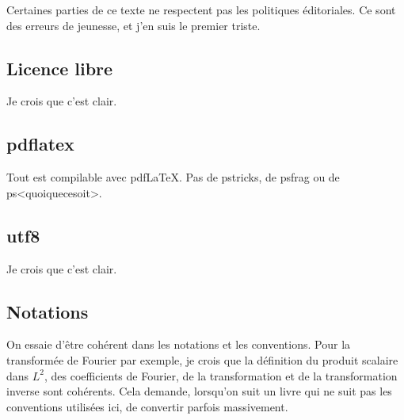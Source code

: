 Certaines parties de ce texte ne respectent pas les politiques éditoriales. Ce sont des erreurs de jeunesse, et j'en suis le premier triste.

\subsection{Licence libre}
\label{SUBooINTROpoliticsFreelic}

Je crois que c'est clair.

\subsection{pdflatex}
\label{SUBooINTROpoliticsPdflatex}

Tout est compilable avec pdf\LaTeX. Pas de pstricks, de psfrag ou de ps<quoiquecesoit>.

\subsection{utf8}
\label{SUBooINTROpoliticsUTF8}

Je crois que c'est clair.

\subsection{Notations}
\label{SUBooINTROpoliticsNotations}

On essaie d'être cohérent dans les notations et les conventions. Pour la transformée de Fourier par exemple, je crois que la définition du produit scalaire dans \( L^2\), des coefficients de Fourier, de la transformation et de la transformation inverse sont cohérents. Cela demande, lorsqu'on suit un livre qui ne suit pas les conventions utilisées ici, de convertir parfois massivement.


